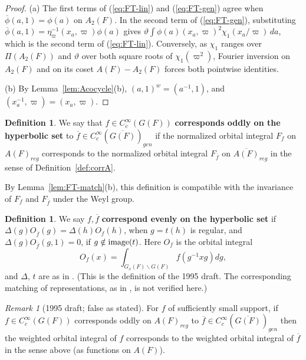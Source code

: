 \documentclass[12pt,letterpaper]{book}
\theoremstyle{plain}
\theoremstyle{definition}
\newtheorem{definition}[theorem]{Definition}
\theoremstyle{remark}
\theoremstyle{remark}
\newtheorem{remyy}{Remark}
\begin{document}
\begin{proof}
(a) The first terms of (\ref{eq:FT-lin}) and (\ref{eq:FT-gen}) agree
when $\overline{\phi}(a,1)=\phi(a)$ on $A_2(F)$. In the second term of
(\ref{eq:FT-gen}), substituting
$\overline{\phi}(a,1)=\eta_\varpi^{-1}(x_a,\varpi)\phi(a)$ gives
$\vartheta\int\phi(a)(x_a,\varpi)^2\chi_1(x_a/\varpi)\,da$, which is the
second term of (\ref{eq:FT-lin}). Conversely, as $\chi_1$ ranges over
$\Pi(A_2(F))$ and $\vartheta$ over both square roots of
$\chi_1(\varpi^2)$, Fourier inversion on $A_2(F)$ and on its coset
$A(F)-A_2(F)$ forces both pointwise identities.

(b) By Lemma~\ref{lem:Acocycle}(b), $(a,1)^w=(a^{-1},1)$, and
$(x_a^{-1},\varpi)=(x_a,\varpi)$.
\end{proof}

\begin{definition} We say that
$f \in C_c^\infty(G(F))$ {\bf corresponds oddly
on the hyperbolic set} to
$\overline{f}\in C_c^\infty(\overline{G(F)})_{gen}$
if the normalized orbital integral $F_f$ on $A(F)_{reg}$ corresponds to
the normalized orbital integral $F_{\overline{f}}$ on
$\overline{A(F)}_{reg}$ in the sense of Definition~\ref{def:corrA}.
\end{definition}

By Lemma~\ref{lem:FT-match}(b), this definition is compatible with the
invariance of $F_f$ and $F_{\overline f}$ under the Weyl group.

\begin{definition}
We say $f,\overline{f}$ {\bf correspond evenly on the hyperbolic set}
if $\Delta(g)O_{\overline{f}}(g)=\Delta(h)O_f(h)$, when
$g=t(h)$ is regular, and $\Delta(g)O_{\overline{f}}(g,1)=0$,
if $g\notin {\rm image}(t)$. Here $O_f$ is the orbital integral
\[
O_f(x)=\int_{G_x(F)\backslash G(F)} f(g^{-1}xg)dg,
\]
and $\Delta$, $t$ are as in \cite{Fl}. (This is the definition of the
1995 draft. The corresponding matching of representations, as in
\cite{Fl}, is not verified here.)
\end{definition}

\begin{remyy}[1995 draft; false as stated]\label{lem:weighted-small}
For $f$ of sufficiently small support, if
$f \in C_c^\infty(G(F))$ corresponds oddly on $A(F)_{reg}$ to
$\overline{f}\in C_c^\infty(\overline{G(F)})_{gen}$
then the weighted orbital integral of
$f$ corresponds to the weighted orbital integral of
$\overline{f}$ in the sense above (as functions on $A(F)$).
\end{remyy}
\end{document}
